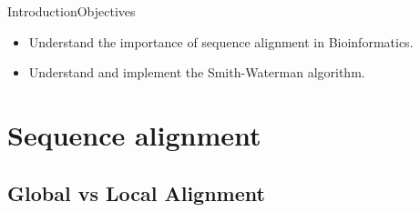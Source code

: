 \documentclass[10pt]{beamer}
\newcommand{\1}{
	\setbeamertemplate{background}{
		\texttt{[image: img/1]}
		\tikz[overlay] \fill[fill opacity=0.75,fill=white] (0,0) rectangle (-\paperwidth,\paperheight);
	}
}
\begin{document}
\begin{frame}{Introduction}{Objectives}
\begin{itemize}
    \item<1-> Understand the importance of sequence alignment in Bioinformatics. 
    \item<2-> Understand and implement the Smith-Waterman algorithm.
  \end{itemize}
\end{frame}



\section{Sequence alignment}

\subsection{Global vs Local Alignment}
\end{document}
